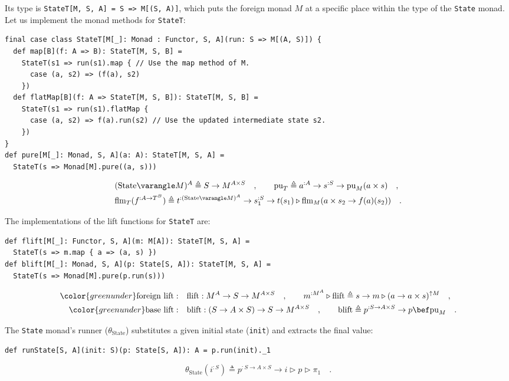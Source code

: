 Its type is \lstinline!StateT[M, S, A] = S => M[(S, A)]!, which puts
the foreign monad $M$ at a specific place within the type of the
\lstinline!State! monad. Let us implement the monad methods for \lstinline!StateT!:
\begin{lstlisting}
final case class StateT[M[_]: Monad : Functor, S, A](run: S => M[(A, S)]) {
  def map[B](f: A => B): StateT[M, S, B] =
    StateT(s1 => run(s1).map { // Use the map method of M.
      case (a, s2) => (f(a), s2)
    })
  def flatMap[B](f: A => StateT[M, S, B]): StateT[M, S, B] =
    StateT(s1 => run(s1).flatMap {
      case (a, s2) => f(a).run(s2) // Use the updated intermediate state s2.
    })
}
def pure[M[_]: Monad, S, A](a: A): StateT[M, S, A] =
  StateT(s => Monad[M].pure((a, s)))
\end{lstlisting}
\begin{align}
 & (\text{State}\varangle M)^{A}\triangleq S\rightarrow M^{A\times S}\quad,\quad\quad\text{pu}_{T}\triangleq a^{:A}\rightarrow s^{:S}\rightarrow\text{pu}_{M}(a\times s)\quad,\label{eq:pure-for-stateT-transformer}\\
 & \text{flm}_{T}(f^{:A\rightarrow T^{B}})\triangleq t^{:(\text{State}\varangle M)^{A}}\rightarrow s_{1}^{:S}\rightarrow t(s_{1})\triangleright\text{flm}_{M}(a\times s_{2}\rightarrow f(a)(s_{2}))\quad.\label{eq:flatmap-for-stateT-transformer}
\end{align}

The implementations of the lift functions for \lstinline!StateT!
are:
\begin{lstlisting}
def flift[M[_]: Functor, S, A](m: M[A]): StateT[M, S, A] =
  StateT(s => m.map { a => (a, s) })
def blift[M[_]: Monad, S, A](p: State[S, A]): StateT[M, S, A] =
  StateT(s => Monad[M].pure(p.run(s)))
\end{lstlisting}
\begin{align*}
{\color{greenunder}\text{foreign lift}:}\quad & \text{flift}:M^{A}\rightarrow S\rightarrow M^{A\times S}\quad,\quad\quad m^{:M^{A}}\triangleright\text{flift}\triangleq s\rightarrow m\triangleright(a\rightarrow a\times s)^{\uparrow M}\quad,\\
{\color{greenunder}\text{base lift}:}\quad & \text{blift}:(S\rightarrow A\times S)\rightarrow S\rightarrow M^{A\times S}\quad,\quad\quad\text{blift}\triangleq p^{:S\rightarrow A\times S}\rightarrow p\bef\text{pu}_{M}\quad.
\end{align*}

The \lstinline!State! monad\textsf{'}s runner ($\theta_{\text{State}}$) substitutes
a given initial state (\lstinline!init!) and extracts the final value:
\begin{lstlisting}
def runState[S, A](init: S)(p: State[S, A]): A = p.run(init)._1
\end{lstlisting}
\[
\theta_{\text{State}}(i^{:S})\triangleq p^{:S\rightarrow A\times S}\rightarrow i\triangleright p\triangleright\pi_{1}\quad.
\]

